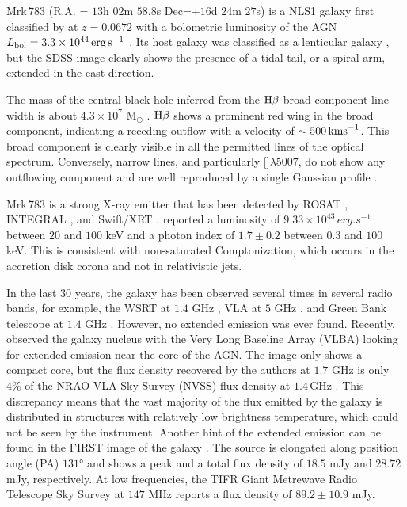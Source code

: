 \documentclass[../main.tex]{subfiles}
\begin{document}
Mrk\,783 (R.A. = $13$h $02$m $58.8$s Dec=$+16$d $24$m $27$s) is a NLS1 galaxy first classified by \citet{Osterbrock85} at $z = 0.0672$ \citep{Hewitt91} with a bolometric luminosity of the AGN $L_{\rm bol} = 3.3\times10^{44}\,\si{erg.s^{-1}}$ \citep{Berton15a}.
Its host galaxy was classified as a lenticular galaxy \citep{Petrosian07}, but the SDSS image clearly shows the presence of a tidal tail, or a spiral arm, extended in the east direction.

The mass of the central black hole inferred from the $\Hb$ broad component line width is about $4.3\times10^7$ M$_{\odot}$ \citep{Berton15a}.
$\Hb$ shows a prominent red wing in the broad component, indicating a receding outflow with a velocity of $\sim500\,\si{\kms}$. 
This broad component is clearly visible in all the permitted lines of the optical spectrum. 
Conversely, narrow lines, and particularly []$\lambda5007$, do not show any outflowing component and are well reproduced by a single Gaussian profile \citep{Berton16b}.
 
Mrk\,783 is a strong X-ray emitter that has been detected by ROSAT \citep{Schwope00}, INTEGRAL \citep{Krivonos07}, and Swift/XRT \citep{Panessa11}.  
\citet{Panessa11} reported a luminosity of $9.33\times10^{43}\,\si{erg.s^{-1}}$ between $20$ and $100$ keV and a photon index of $1.7\pm0.2$ between $0.3$ and $100$ keV.
This is consistent with non-saturated Comptonization, which occurs in the accretion disk corona and not in relativistic jets.

In the last 30 years, the galaxy has been observed several times in several radio bands, for example, the WSRT at $1.4$ GHz \citep{Meurs81}, VLA at $5$ GHz \citep{Ulvestad84,Ulvestad95}, and Green Bank telescope at $1.4$ GHz \citep{Bicay95}.
However, no extended emission was ever found.
Recently, \citet{Doi13} observed the galaxy nucleus with the Very Long Baseline Array (VLBA) looking for extended emission near the core of the AGN.
The image only shows a compact core, but the flux density recovered by the authors at $1.7$ GHz is only $4\%$ of the NRAO VLA Sky Survey (NVSS) flux density at $1.4\,$GHz \citep[$S_{\nu}=33.2\,$mJy;][]{Condon98}.
This discrepancy means that the vast majority of the flux emitted by the galaxy is distributed in structures with relatively low brightness temperature, which could not be seen by the instrument.
Another hint of the extended emission can be found in the FIRST image of the galaxy \citep{Becker95}.
The source is elongated along position angle (PA) $\ang{131}$ and shows a peak and a total flux density of $18.5$ mJy and $28.72$ mJy, respectively.
At low frequencies, the TIFR Giant Metrewave Radio Telescope Sky Survey \citep[TGSS;][]{Intema17} at $147$ MHz reports a flux density of $89.2\pm10.9$ mJy.
\end{document}
